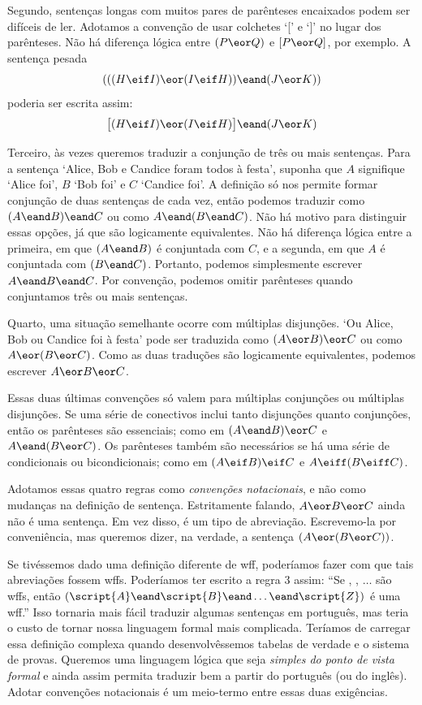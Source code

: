 Segundo, sentenças longas com muitos pares de parênteses encaixados podem ser difíceis de ler. Adotamos a convenção de usar colchetes `[' e `]' no lugar dos parênteses. Não há diferença lógica entre $(P\eor Q)$ e $[P\eor Q]$, por exemplo. A sentença pesada
$$(((H \eif I) \eor (I \eif H)) \eand (J \eor K))$$
poderia ser escrita assim:
$$\bigl[(H \eif I) \eor (I \eif H)\bigr] \eand (J \eor K)$$

Terceiro, às vezes queremos traduzir a conjunção de três ou mais sentenças. Para a sentença `Alice, Bob e Candice foram todos à festa', suponha que $A$ signifique `Alice foi', $B$ `Bob foi' e $C$ `Candice foi'. A definição só nos permite formar conjunção de duas sentenças de cada vez, então podemos traduzir como $(A \eand B) \eand C$ ou como $A \eand (B \eand C)$. Não há motivo para distinguir essas opções, já que são logicamente equivalentes. Não há diferença lógica entre a primeira, em que $(A \eand B)$ é conjuntada com $C$, e a segunda, em que $A$ é conjuntada com $(B \eand C)$. Portanto, podemos simplesmente escrever $A \eand B \eand C$. Por convenção, podemos omitir parênteses quando conjuntamos três ou mais sentenças.

Quarto, uma situação semelhante ocorre com múltiplas disjunções. `Ou Alice, Bob ou Candice foi à festa' pode ser traduzida como $(A \eor B) \eor C$ ou como $A \eor (B \eor C)$. Como as duas traduções são logicamente equivalentes, podemos escrever $A \eor B \eor C$.

Essas duas últimas convenções só valem para múltiplas conjunções ou múltiplas disjunções. Se uma série de conectivos inclui tanto disjunções quanto conjunções, então os parênteses são essenciais; como em $(A \eand B) \eor C$ e $A \eand (B \eor C)$. Os parênteses também são necessários se há uma série de condicionais ou bicondicionais; como em $(A \eif B) \eif C$ e $A \eiff (B \eiff C)$.

Adotamos essas quatro regras como \emph{convenções notacionais}, e não como mudanças na definição de sentença. Estritamente falando, $A \eor B \eor C$ ainda não é uma sentença. Em vez disso, é um tipo de abreviação. Escrevemo-la por conveniência, mas queremos dizer, na verdade, a sentença $(A \eor (B \eor C))$.

Se tivéssemos dado uma definição diferente de wff, poderíamos fazer com que tais abreviações fossem wffs. Poderíamos ter escrito a regra 3 assim: ``Se , , $\ldots$  são wffs, então $(\script{A}\eand\script{B}\eand\ldots\eand\script{Z})$ é uma wff.'' Isso tornaria mais fácil traduzir algumas sentenças em português, mas teria o custo de tornar nossa linguagem formal mais complicada. Teríamos de carregar essa definição complexa quando desenvolvêssemos tabelas de verdade e o sistema de provas. Queremos uma linguagem lógica que seja \emph{simples do ponto de vista formal} e ainda assim permita traduzir bem a partir do português (ou do inglês). Adotar convenções notacionais é um meio-termo entre essas duas exigências.



